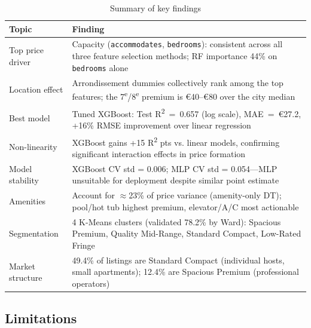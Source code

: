 \documentclass[12pt, a4paper]{article}
\begin{document}
\begin{table}[H]
  \centering
  \caption{Summary of key findings}
  \label{tab:summary}
  \small
  \begin{tabularx}{\textwidth}{lX}
    \toprule
    \textbf{Topic} & \textbf{Finding} \\
    \midrule
    Top price driver & Capacity (\texttt{accommodates}, \texttt{bedrooms}): consistent across all three feature selection methods; RF importance 44\% on \texttt{bedrooms} alone \\
    Location effect & Arrondissement dummies collectively rank among the top features; the 7\textsuperscript{e}/8\textsuperscript{e} premium is \euro{}40--\euro{}80 over the city median \\
    Best model & Tuned XGBoost: Test R\textsuperscript{2}~=~0.657 (log scale), MAE~=~\euro{}27.2, +16\% RMSE improvement over linear regression \\
    Non-linearity & XGBoost gains +15 R\textsuperscript{2} pts vs. linear models, confirming significant interaction effects in price formation \\
    Model stability & XGBoost CV std = 0.006; MLP CV std = 0.054---MLP unsuitable for deployment despite similar point estimate \\
    Amenities & Account for \(\approx\)23\% of price variance (amenity-only DT); pool/hot tub highest premium, elevator/A/C most actionable \\
    Segmentation & 4 K-Means clusters (validated 78.2\% by Ward): Spacious Premium, Quality Mid-Range, Standard Compact, Low-Rated Fringe \\
    Market structure & 49.4\% of listings are Standard Compact (individual hosts, small apartments); 12.4\% are Spacious Premium (professional operators) \\
    \bottomrule
  \end{tabularx}
\end{table}

\subsection{Limitations}
\end{document}
